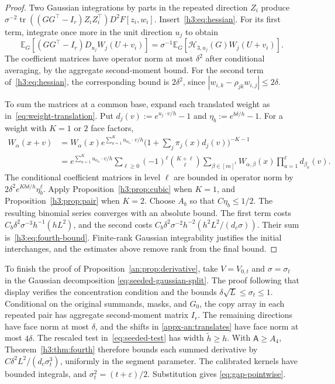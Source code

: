 \documentclass[11pt,letterpaper]{article}
\theoremstyle{remark}
\newcommand{\E}{\mathbb E}
\newcommand{\tr}{\operatorname{tr}}
\begin{document}
\begin{proof}
Two Gaussian integrations by parts in the repeated direction $Z_i$
produce $\sigma^{-2}\tr((GG^\top-I_r)Z_iZ_i^\top)D^2F[z_i,w_i]$.
Insert~\eqref{h3:eq:hessian}. For its first term, integrate once more
in the unit direction $u_j$ to obtain
\[
 \E_G[(GG^\top-I_r)D_{u_j}W_j(U+v_i)]
 =\sigma^{-1}\E_G[\mathcal H_{3,u_j}(G)W_j(U+v_i)].
\]
The coefficient matrices have operator norm at most $\delta^2$
after conditional averaging, by the aggregate second-moment bound.
For the second term of~\eqref{h3:eq:hessian}, the corresponding bound is
$2\delta^2$, since $|w_{i,k}-\rho_{jk}w_{i,j}|\le2\delta$.

To sum the matrices at a common base, expand each translated weight as in~\eqref{eq:weight-translation}. Put
$d_j(v):=e^{u_j\cdot v/h}-1$ and
$\eta_b:=e^{b\delta/h}-1$. For a weight with $K=1$ or $2$ face factors,
\begin{align*}
 W_\alpha(x+v)
 &=W_\alpha(x)e^{\sum_{a=1}^K u_{\alpha_a}\cdot v/h}
     \bigl(1+\sum_j\pi_j(x)d_j(v)\bigr)^{-K-1}\\
 &=e^{\sum_{a=1}^K u_{\alpha_a}\cdot v/h}
   \sum_{\ell\ge0}(-1)^\ell\binom{K+\ell}{\ell}
   \sum_{\beta\in[m]^\ell}W_{\alpha,\beta}(x)
                       \prod_{a=1}^\ell d_{\beta_a}(v).
\end{align*}
The conditional coefficient matrices in level $\ell$ are bounded
in operator norm by $2\delta^2 e^{Kb\delta/h}\eta_b^\ell$.
Apply Proposition~\ref{h3:prop:cubic} when $K=1$, and
Proposition~\ref{h3:prop:pair} when $K=2$.
Choose $A_b$ so that $C\eta_b\le1/2$.
The resulting binomial series converges with an absolute bound.
The first term costs $C_b\delta^2\sigma^{-3}h^{-1}(hL^2)$,
and the second costs
$C_b\delta^2\sigma^{-2}h^{-2}(h^2L^2/(d_c\sigma))$.
Their sum is~\eqref{h3:eq:fourth-bound}.
Finite-rank Gaussian integrability justifies the initial interchanges,
and the estimates above remove rank from the final bound.
\end{proof}

To finish the proof of Proposition~\ref{an:prop:derivative}, take
\(V=V_{0,t}\) and \(\sigma=\sigma_t\) in the Gaussian decomposition
\eqref{eq:seeded-gaussian-split}. The proof following that display
verifies the concentration condition and the bounds
\(\delta\sqrt L\le\sigma_t\le1\). Conditional on the original
summands, masks, and \(G_0\), the copy array in each repeated pair
has aggregate second-moment matrix \(I_r\). The remaining directions
have face norm at most \(\delta\), and the shifts in
\eqref{appx-an:translates} have face norm at most \(4\delta\).
The rescaled test in~\eqref{eq:seeded-test} has width
\(\widetilde h\ge h\). With \(\mathsf A\ge A_4\),
Theorem~\ref{h3:thm:fourth} therefore bounds each summed derivative
by \(C\delta^2L^2/(d_c\sigma_t^3)\), uniformly in the segment
parameter. The calibrated kernels have bounded integrals, and
\(\sigma_t^2=(t+\varepsilon)/2\). Substitution gives
\eqref{eq:gap-pointwise}.
\end{document}
